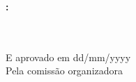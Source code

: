 \begin{folhadeaprovacao}

    \begin{center}
      {\ABNTEXchapterfont\large\MakeUppercase{\imprimirautor}}
  
      \vspace*{\fill}\vspace*{\fill}
      \begin{center}
        \ABNTEXchapterfont\bfseries\large\MakeUppercase{\imprimirtitulo}\normalfont\MakeUppercase{:
        \imprimirsubtitulo}	
      \end{center}
      \vspace*{\fill}
      
      \hfill
      \begin{minipage}{.7\textwidth}
          \imprimirpreambulo \\ \\
          E aprovado em dd/mm/yyyy \\ %
          Pela comissão organizadora
      \end{minipage}%
      \vspace*{\fill}
     \end{center}
  
\end{folhadeaprovacao}

% 
